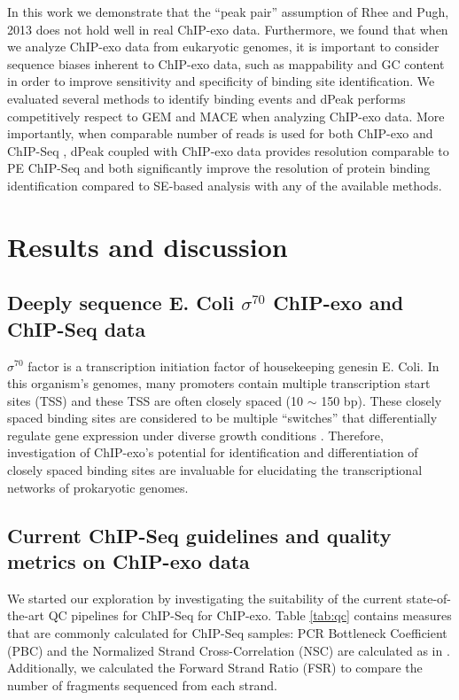 \documentclass{bmcart}\usepackage[]{graphicx}\usepackage[]{color}
\newcommand{\sig}{\sigma^{70}}
\begin{document}
In this work we demonstrate that the ``peak pair'' assumption of Rhee
and Pugh, 2013 \cite{exo2} does not hold well in real ChIP-exo
data. Furthermore, we found that when we analyze ChIP-exo data from
eukaryotic genomes, it is important to consider sequence biases
inherent to ChIP-exo data, such as mappability and GC content in order
to improve sensitivity and specificity of binding site
identification. We evaluated several methods to identify binding events
and dPeak performs competitively respect to GEM and MACE when
analyzing ChIP-exo data. More importantly, when comparable number of
reads is used for both ChIP-exo and ChIP-Seq , dPeak coupled with
ChIP-exo data provides resolution comparable to PE ChIP-Seq and both
significantly improve the resolution of protein binding identification
compared to SE-based analysis with any of the available methods.

\section{Results and discussion}
\label{sec:results}

\subsection{Deeply sequence E. Coli $\sig$ ChIP-exo and ChIP-Seq data}
 
$\sig$ factor is a transcription initiation factor of housekeeping
genesin E. Coli. In this organism's genomes, many promoters contain
multiple transcription start sites (TSS) and these TSS are often
closely spaced (10 $\sim$ 150 bp). These closely spaced binding sites
are considered to be multiple ``switches'' that differentially
regulate gene expression under diverse growth conditions
\cite{regulondb}. Therefore, investigation of ChIP-exo's potential for
identification and differentiation of closely spaced binding sites are
invaluable for elucidating the transcriptional networks of prokaryotic
genomes.

\subsection{Current ChIP-Seq guidelines and quality metrics on ChIP-exo data}

We started our exploration by investigating the suitability of the
current state-of-the-art QC pipelines for ChIP-Seq for ChIP-exo. Table
\ref{tab:qc} contains measures that are commonly calculated for
ChIP-Seq samples: PCR Bottleneck Coefficient (PBC) and the Normalized
Strand Cross-Correlation (NSC) are calculated as in \cite{encode_qc}.
Additionally, we calculated the Forward Strand Ratio (FSR) to compare
the number of fragments sequenced from each strand.
\end{document}
